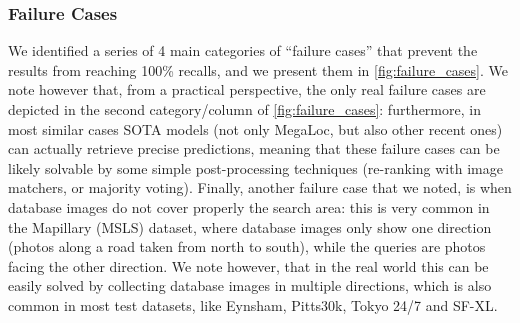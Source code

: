 \subsubsection{Failure Cases}
We identified a series of 4 main categories of ``failure cases'' that prevent the results from reaching 100\% recalls, and we present them in \cref{fig:failure_cases}.
We note however that, from a practical perspective, the only real failure cases are depicted in the second category/column of \cref{fig:failure_cases}: furthermore, in most similar cases SOTA models (\ie not only MegaLoc, but also other recent ones) can actually retrieve precise predictions, meaning that these failure cases can be likely solvable by some simple post-processing techniques (\eg re-ranking with image matchers, or majority voting).
Finally, another failure case that we noted, is when database images do not cover properly the search area: this is very common in the Mapillary (MSLS) dataset, where database images only show one direction (\eg photos along a road taken from north to south), while the queries are photos facing the other direction. We note however, that in the real world this can be easily solved by collecting database images in multiple directions, which is also common in most test datasets, like Eynsham, Pitts30k, Tokyo 24/7 and SF-XL.